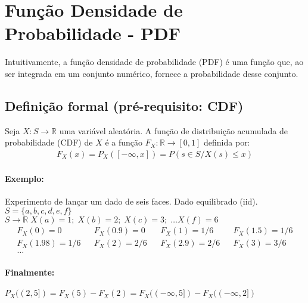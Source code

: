 \documentclass{article}
\begin{document}
\section{Função Densidade de Probabilidade - PDF}
Intuitivamente, a função densidade de probabilidade (PDF) é uma função que, ao ser integrada em um
conjunto numérico, fornece a probabilidade desse conjunto.

\subsection{Definição formal (pré-requisito: CDF)}
Seja $X: S \rightarrow \mathbb{R}$ uma variável aleatória. A função de distribuição acumulada de
probabilidade (CDF) de $X$ é a função $F_X: \mathbb{R} \rightarrow [0,1]$ definida por:
\begin{align*}
    F_X(x) = P_X([-\infty, x]) = P(s \in S / X(s) \leq x)
\end{align*}

\paragraph{Exemplo:}
Experimento de lançar um dado de seis faces. Dado equilibrado (iid). $S = \{a,b,c,d,e,f\}$\\
$S \rightarrow \mathbb{R} \; X(a) = 1;\; X(b) = 2;\; X(c) = 3;\; \ldots X(f) = 6$
\begin{align*}
    F_X(0) = 0 && F_X(0.9) = 0 && F_X(1) = 1/6 && F_X(1.5) = 1/6 \\
    F_X(1.98) = 1/6 && F_X(2) = 2/6 && F_X(2.9) = 2/6 && F_X(3) = 3/6 \\
    \ldots
\end{align*}

\paragraph{Finalmente:}
$P_X((2,5]) = F_X(5) - F_X(2) = F_X((-\infty, 5]) - F_X((-\infty, 2])$
\end{document}
